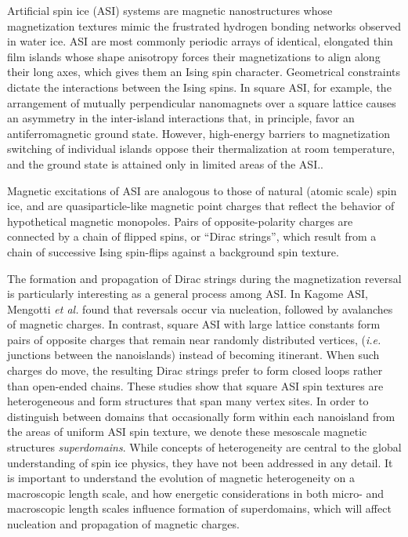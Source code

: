 \documentclass[aps, prb, reprint, showpacs, superscriptaddress]{revtex4-1}
\begin{document}
\maketitle
Artificial spin ice (ASI) systems are magnetic nanostructures whose magnetization textures mimic the frustrated hydrogen bonding networks observed in water ice.\cite{Wang, Nisoli, Pauling}
ASI are most commonly periodic arrays of identical, elongated thin film islands whose shape anisotropy forces their magnetizations to align along their long axes, which gives them an Ising spin character.
Geometrical constraints dictate the interactions between the Ising spins. 
In square ASI, for example, the arrangement of mutually perpendicular nanomagnets over a square lattice causes an asymmetry in the inter-island interactions that, in principle, favor an antiferromagnetic ground state.
However, high-energy barriers to magnetization switching of individual islands oppose their thermalization at room temperature, and the ground state is attained only in limited areas of the ASI.\cite{Kapaklis,Arnalds}.

Magnetic excitations of ASI are analogous to those of natural (atomic scale) spin ice\cite{Fennell1, Fennell2, Morgan, Mol}, and are quasiparticle-like magnetic point charges that reflect the behavior of hypothetical magnetic monopoles.\cite{Jaubert}
Pairs of opposite-polarity charges are connected by a chain of flipped spins, or ``Dirac strings'', which result from a chain of successive Ising spin-flips against a background spin texture.\cite{Castelnovo, Mol}

The formation and propagation of Dirac strings during the magnetization reversal is particularly interesting as a general process among ASI. 
In Kagome ASI, Mengotti \textit{et al.}\cite{Mengotti} found that reversals occur via nucleation, followed by avalanches of magnetic charges.
In contrast, square ASI with large lattice constants form pairs of opposite charges that remain near randomly distributed vertices, (\textit{i.e.} junctions between the nanoislands) instead of becoming itinerant.\cite{Phatak-NJP}
When such charges do move, the resulting Dirac strings prefer to form closed loops rather than open-ended chains.\cite{Morgan}
These studies show that square ASI spin textures are heterogeneous and form structures that span many vertex sites.
In order to distinguish between domains that occasionally form within each nanoisland from the areas of uniform ASI spin texture, we denote these mesoscale magnetic structures \textit{superdomains}.
While concepts of heterogeneity are central to the global understanding of spin ice physics, they have not been addressed in any detail.
It is important to understand the evolution of magnetic heterogeneity on a macroscopic length scale, and how energetic considerations in both micro- and macroscopic length scales influence formation of superdomains, which will affect nucleation and propagation of magnetic charges.
\end{document}

